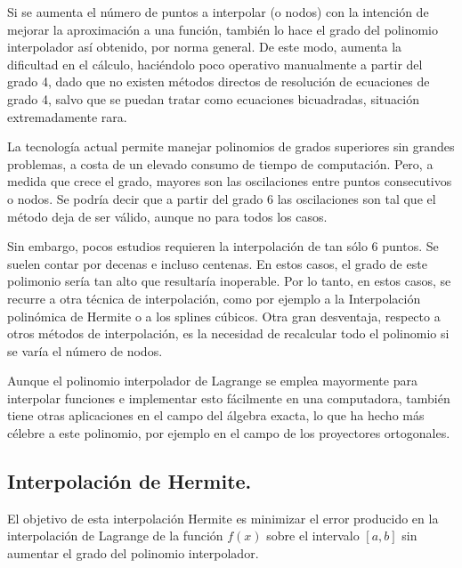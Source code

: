 \hspace{0.4cm} Si se aumenta el n\'umero de puntos a interpolar (o nodos) con la intenci\'on de mejorar la aproximaci\'on a una funci\'on, tambi\'en lo hace el grado del polinomio interpolador as\'i obtenido, por norma general. De este modo, aumenta la dificultad en el c\'alculo, haci\'endolo poco operativo manualmente a partir del grado 4, dado que no existen m\'etodos directos de resoluci\'on de ecuaciones de grado 4, salvo que se puedan tratar como ecuaciones bicuadradas, situaci\'on extremadamente rara.

\hspace{0.4cm} La tecnolog\'ia actual permite manejar polinomios de grados superiores sin grandes problemas, a costa de un elevado consumo de tiempo de computaci\'on. Pero, a medida que crece el grado, mayores son las oscilaciones entre puntos consecutivos o nodos. Se podr\'ia decir que a partir del grado 6 las oscilaciones son tal que el m\'etodo deja de ser v\'alido, aunque no para todos los casos.

\hspace{0.4cm} Sin embargo, pocos estudios requieren la interpolaci\'on de tan s\'olo 6 puntos. Se suelen contar por decenas e incluso centenas. En estos casos, el grado de este polimonio ser\'ia tan alto que resultar\'ia inoperable. Por lo tanto, en estos casos, se recurre a otra t\'ecnica de interpolaci\'on, como por ejemplo a la Interpolaci\'on polin\'omica de Hermite o a los splines c\'ubicos. Otra gran desventaja, respecto a otros m\'etodos de interpolaci\'on, es la necesidad de recalcular todo el polinomio si se var\'ia el n\'umero de nodos.

\hspace{0.4cm} Aunque el polinomio interpolador de Lagrange se emplea mayormente para interpolar funciones e implementar esto f\'acilmente en una computadora, tambi\'en tiene otras aplicaciones en el campo del \'algebra exacta, lo que ha hecho m\'as c\'elebre a este polinomio, por ejemplo en el campo de los proyectores ortogonales.

\subsection{Interpolaci\'on de Hermite.\\}

\hspace{0.4cm} El objetivo de esta interpolaci\'on Hermite es minimizar el error producido en la interpolaci\'on de Lagrange de la funci\'on $f(x)$ sobre el intervalo $[a, b]$ sin aumentar el grado del polinomio interpolador.



